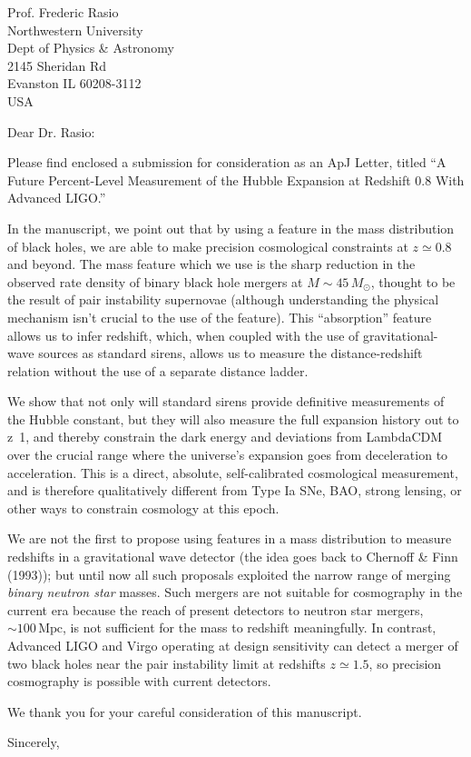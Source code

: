 \documentclass{letter}
\begin{document}
\begin{letter}{Prof. Frederic Rasio\\Northwestern University\\Dept of Physics \& Astronomy\\2145 Sheridan Rd\\Evanston IL 60208-3112\\USA}

\opening{Dear Dr. Rasio:}

Please find enclosed a submission for consideration as an ApJ Letter, titled
``A Future Percent-Level Measurement of the Hubble Expansion at Redshift 0.8
With Advanced LIGO.''

In the manuscript, we point out that by using a feature in the mass distribution
of black holes, we are able to make precision cosmological constraints at $z
\simeq 0.8$ and beyond. The mass feature which we use is the sharp reduction in
the observed rate density of binary black hole mergers at $M \sim 45\, M_\odot$,
thought to be the result of pair instability supernovae (although understanding
the physical mechanism isn't crucial to the use of the feature). This
``absorption'' feature allows us to infer redshift, which, when coupled with the
use of gravitational-wave sources as standard sirens, allows us to measure the
distance-redshift relation without the use of a separate distance ladder.

We show that not only will standard sirens provide definitive measurements of
the Hubble constant, but they will also measure the full expansion history out
to z~1, and thereby constrain the dark energy and deviations from LambdaCDM over
the crucial range where the universe's expansion goes from deceleration to
acceleration. This is a direct, absolute, self-calibrated cosmological
measurement, and is therefore qualitatively different from Type Ia SNe, BAO,
strong lensing, or other ways to constrain cosmology at this epoch.

We are not the first to propose using features in a mass distribution to measure
redshifts in a gravitational wave detector (the idea goes back to Chernoff \&
Finn (1993)); but until now all such proposals exploited the narrow range of
merging \emph{binary neutron star} masses.  Such mergers are not suitable for
cosmography in the current era because the reach of present detectors to neutron
star mergers, $\sim 100 \, \mathrm{Mpc}$, is not sufficient for the mass to
redshift meaningfully.  In contrast, Advanced LIGO and Virgo operating at design
sensitivity can detect a merger of two black holes near the pair instability
limit at redshifts $z \simeq 1.5$, so precision cosmography is possible with
current detectors.

We thank you for your careful consideration of this manuscript.

\closing{Sincerely,}

\end{letter}
\end{document}
